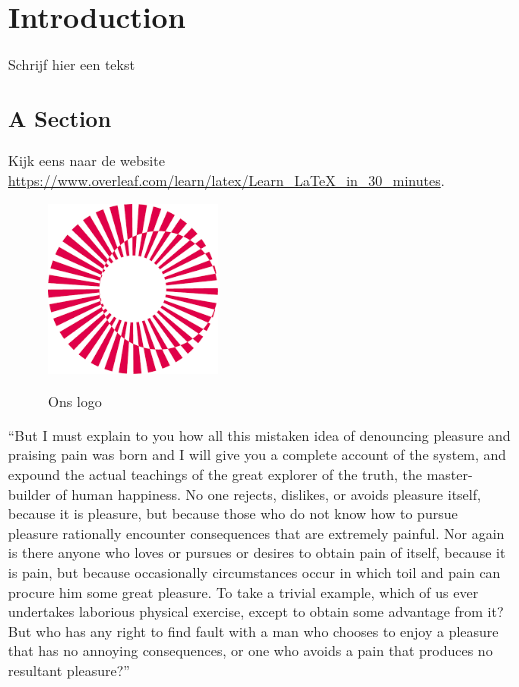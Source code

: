 \chapter{Introduction}
\label{chap:intro}
Schrijf hier een tekst
\section{A Section}
\label{sec:section1}

Kijk eens naar de website \url{https://www.overleaf.com/learn/latex/Learn_LaTeX_in_30_minutes}.

\begin{figure}[h!]
\centering
\includegraphics[width=0.4\textwidth]{ucll.png}
\label{fig:logo}
\caption{Ons logo}
\end{figure}

``But I must explain to you how all this mistaken idea of denouncing pleasure and praising pain was born and I will give you a complete account of the system, and expound the actual teachings of the great explorer of the truth, the master-builder of human happiness. No one rejects, dislikes, or avoids pleasure itself, because it is pleasure, but because those who do not know how to pursue pleasure rationally encounter consequences that are extremely painful. Nor again is there anyone who loves or pursues or desires to obtain pain of itself, because it is pain, but because occasionally circumstances occur in which toil and pain can procure him some great pleasure. To take a trivial example, which of us ever undertakes laborious physical exercise, except to obtain some advantage from it? But who has any right to find fault with a man who chooses to enjoy a pleasure that has no annoying consequences, or one who avoids a pain that produces no resultant pleasure?''
